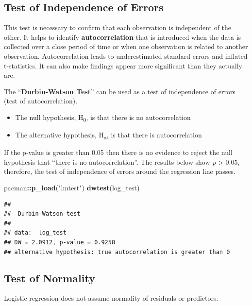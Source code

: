 \documentclass[
]{article}
\newenvironment{Shaded}{\begin{snugshade}}{\end{snugshade}}
\newcommand{\FunctionTok}[1]{\textcolor[rgb]{0.13,0.29,0.53}{\textbf{#1}}}
\newcommand{\NormalTok}[1]{#1}
\newcommand{\SpecialCharTok}[1]{\textcolor[rgb]{0.81,0.36,0.00}{\textbf{#1}}}
\newcommand{\StringTok}[1]{\textcolor[rgb]{0.31,0.60,0.02}{#1}}
\begin{document}
\subsection{Test of Independence of
Errors}\label{test-of-independence-of-errors}

This test is necessary to confirm that each observation is independent
of the other. It helps to identify \textbf{autocorrelation} that is
introduced when the data is collected over a close period of time or
when one observation is related to another observation. Autocorrelation
leads to underestimated standard errors and inflated t-statistics. It
can also make findings appear more significant than they actually are.

The ``\textbf{Durbin-Watson Test}'' can be used as a test of
independence of errors (test of autocorrelation).

\begin{itemize}
\item
  The null hypothesis, H\textsubscript{0}, is that there is no
  autocorrelation
\item
  The alternative hypothesis, H\textsubscript{a}, is that there is
  autocorrelation
\end{itemize}

If the p-value is greater than 0.05 then there is no evidence to reject
the null hypothesis that ``there is no autocorrelation''. The results
below show \emph{p} \textgreater{} 0.05, therefore, the test of
independence of errors around the regression line passes.

\begin{Shaded}
\begin{Highlighting}[]
\NormalTok{pacman}\SpecialCharTok{::}\FunctionTok{p\_load}\NormalTok{(}\StringTok{"lmtest"}\NormalTok{)}
\FunctionTok{dwtest}\NormalTok{(log\_test)}
\end{Highlighting}
\end{Shaded}

\begin{verbatim}
## 
##  Durbin-Watson test
## 
## data:  log_test
## DW = 2.0912, p-value = 0.9258
## alternative hypothesis: true autocorrelation is greater than 0
\end{verbatim}

\subsection{Test of Normality}\label{test-of-normality}

Logistic regression does not assume normality of residuals or
predictors.
\end{document}
